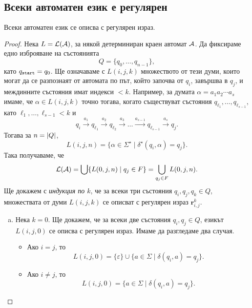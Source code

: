 \subsection{Всеки автоматен език е регулярен}
\begin{framed}
\begin{thm}
  \label{th:regular-kleene}
  Всеки автоматен език се описва с регулярен израз.
\end{thm}
\end{framed}
\begin{proof}
  Нека  $L = \mathcal{L}(\mathcal{A})$, за някой детерминиран краен автомат $\mathcal{A}$.
  Да фиксираме едно изброяване на състоянията
  \[Q = \{q_0,\dots,q_{n-1}\},\]
  като $q_{\texttt{start}} = q_0$.
  Ще означаваме с $L(i,j,k)$ множеството от тези думи, които
  могат да се разпознаят от автомата по път, който започва от $q_i$,
  завършва в $q_j$, и междинните състояния имат индекси $< k$.
  Например, за думата $\alpha = a_1a_2\cdots a_s$ имаме, че $\alpha \in L(i,j,k)$
  точно тогава, когато съществуват състояния $q_{\ell_1},\dots,q_{\ell_{s-1}}$, като $\ell_1,\dots,\ell_{s-1} < k$ и
  \[q_i\stackrel{a_1}{\rightarrow} q_{\ell_1} \stackrel{a_2}{\rightarrow} q_{\ell_2} \stackrel{a_3}{\rightarrow} \dots \stackrel{a_{s-1}}{\rightarrow} q_{\ell_{s-1}}\stackrel{a_s}{\rightarrow} q_j.\]
  Тогава за $n = \vert{Q}\vert$, 
  \[L(i,j,n) = \{\alpha\in\Sigma^\star\mid \delta^\star(q_i,\alpha) = q_j\}.\]
  Така получаваме, че 
  \[\mathcal{L}(\mathcal{A}) = \bigcup\{L(0,j,n)\mid q_j \in F\} = \bigcup_{q_j\in F}L(0,j,n).\]
  Ще докажем с {\em индукция по $k$}, че за всеки три състояния $q_i,q_j,q_k \in Q$, множествата от думи $L(i,j,k)$
  се описват с регулярен израз $\mathbf{r}^k_{i,j}$.
  \begin{enumerate}[a)]
  \item
    Нека $k = 0$. Ще докажем, че за всеки две състояния $q_i,q_j \in Q$, езикът $L(i,j,0)$ се описва с регулярен израз.
    Имаме да разгледаме два случая.
    \begin{itemize}
    \item
      Ако $i = j$, то 
      \begin{equation}
        \label{eq:kleene-equal}
        L(i, j, 0) = \{\varepsilon\}\cup\{a\in\Sigma \mid \delta(q_i,a) = q_j\}.
      \end{equation}
    \item
      Ако $i \neq j$, то
      \[L(i, j, 0) = \{a\in\Sigma \mid \delta(q_i, a) = q_j\}.\]      
    \end{itemize}

\end{enumerate}
\end{proof}
